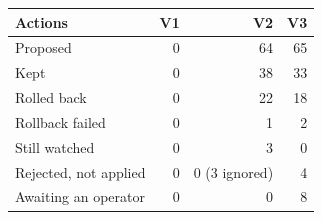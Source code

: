 \begin{tabular}{@{}lrrr@{}}
\toprule
Actions & V1 & V2 & V3 \\
\midrule
Proposed & 0 & 64 & 65 \\
Kept & 0 & 38 & 33 \\
Rolled back & 0 & 22 & 18 \\
Rollback failed & 0 & 1 & 2 \\
Still watched & 0 & 3 & 0 \\
Rejected, not applied & 0 & 0 (3 ignored) & 4 \\
Awaiting an operator & 0 & 0 & 8 \\
\bottomrule
\end{tabular}
